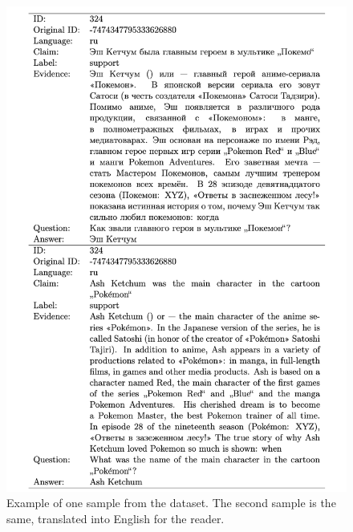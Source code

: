 \begin{figure}[H]
    \centering
    \includegraphics[scale=0.38]{figures/dataset.png}
    \caption{Example of one sample from the dataset. The second sample is the same, translated into English for the reader.}
    \label{fig:dataset}
\end{figure}

